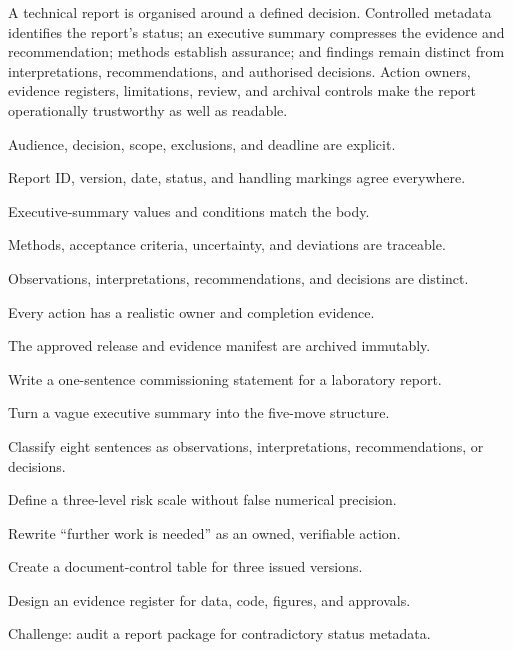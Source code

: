 \chaptersummary

A technical report is organised around a defined decision. Controlled metadata
identifies the report's status; an executive summary compresses the evidence and
recommendation; methods establish assurance; and findings remain distinct from
interpretations, recommendations, and authorised decisions. Action owners,
evidence registers, limitations, review, and archival controls make the report
operationally trustworthy as well as readable.

\chaptercheck
\begin{chapterchecklist}
  \item Audience, decision, scope, exclusions, and deadline are explicit.
  \item Report ID, version, date, status, and handling markings agree everywhere.
  \item Executive-summary values and conditions match the body.
  \item Methods, acceptance criteria, uncertainty, and deviations are traceable.
  \item Observations, interpretations, recommendations, and decisions are distinct.
  \item Every action has a realistic owner and completion evidence.
  \item The approved release and evidence manifest are archived immutably.
\end{chapterchecklist}

\chapterexercisestitle
\begin{chapterexercises}
  \item Write a one-sentence commissioning statement for a laboratory report.
  \item Turn a vague executive summary into the five-move structure.
  \item Classify eight sentences as observations, interpretations,
        recommendations, or decisions.
  \item Define a three-level risk scale without false numerical precision.
  \item Rewrite ``further work is needed'' as an owned, verifiable action.
  \item Create a document-control table for three issued versions.
  \item Design an evidence register for data, code, figures, and approvals.
  \item Challenge: audit a report package for contradictory status metadata.
\end{chapterexercises}
